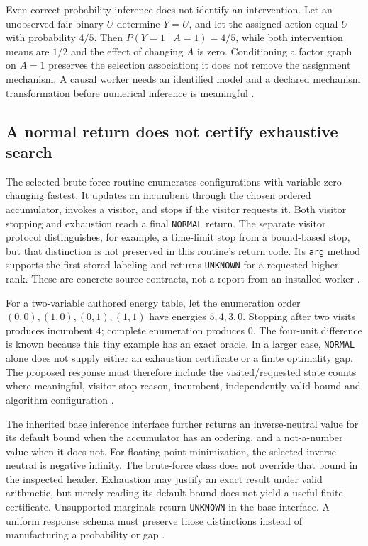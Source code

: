 Even correct probability inference does not identify an intervention.
Let an unobserved fair binary $U$ determine $Y=U$, and let the assigned
action equal $U$ with probability $4/5$. Then $P(Y=1\mid A=1)=4/5$, while
both intervention means are $1/2$ and the effect of changing $A$ is zero.
Conditioning a factor graph on $A=1$ preserves the selection association;
it does not remove the assignment mechanism. A causal worker needs an
identified model and a declared mechanism transformation before numerical
inference is meaningful \citep{exec24_opengm_choice}.

\subsection{A normal return does not certify exhaustive search}
The selected brute-force routine enumerates configurations with variable
zero changing fastest. It updates an incumbent through the chosen ordered
accumulator, invokes a visitor, and stops if the visitor requests it. Both
visitor stopping and exhaustion reach a final \texttt{NORMAL} return.
The separate visitor protocol distinguishes, for example, a time-limit stop
from a bound-based stop, but that distinction is not preserved in this
routine's return code. Its \texttt{arg} method supports the first stored
labeling and returns \texttt{UNKNOWN} for a requested higher rank. These
are concrete source contracts, not a report from an installed worker
\citep{exec24_opengm_source}.

For a two-variable authored energy table, let the enumeration order
$(0,0),(1,0),(0,1),(1,1)$ have energies $5,4,3,0$. Stopping after two
visits produces incumbent $4$; complete enumeration produces $0$.
The four-unit difference is known because this tiny example has an exact
oracle. In a larger case, \texttt{NORMAL} alone does not supply either an
exhaustion certificate or a finite optimality gap. The proposed response
must therefore include the visited/requested state counts where meaningful,
visitor stop reason, incumbent, independently valid bound and algorithm
configuration \citep{exec24_opengm_choice}.

The inherited base inference interface further returns an inverse-neutral
value for its default bound when the accumulator has an ordering, and a
not-a-number value when it does not. For floating-point minimization,
the selected inverse neutral is negative infinity. The brute-force class
does not override that bound in the inspected header. Exhaustion may justify
an exact result under valid arithmetic, but merely reading its default bound
does not yield a useful finite certificate. Unsupported marginals return
\texttt{UNKNOWN} in the base interface. A uniform response schema must
preserve those distinctions instead of manufacturing a probability or gap
\citep{exec24_opengm_source}.

